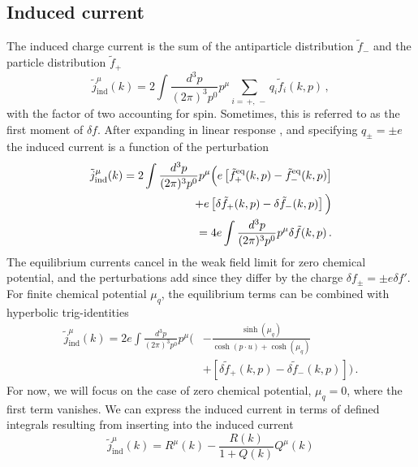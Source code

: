 \subsection{Induced current}

The induced charge current is the sum of the antiparticle distribution $\widetilde{f}_-$ and the particle distribution $\widetilde{f}_+$
\begin{equation}\label{eq:perturbation1}
\tilde{j}_{\mathrm{ind}}^\mu(k) = 2\int \frac{d^3 p}{(2 \pi)^3 p^0}p^\mu 
\sum_{i = \, +, \, -} q_i \tilde{f}_{i}(k,p)\,,
\end{equation}
with the factor of two accounting for spin. Sometimes, this is referred to as the first moment of $\delta f$.
After expanding in linear response , and specifying $q_\pm = \pm e$ the induced current is a function of the perturbation
\begin{align}\label{eq:perturbation2}
\tilde{j}_{\mathrm{ind}}^\mu(k) = 2\int \frac{d^3 p}{(2 \pi)^3 p^0}p^\mu \Big( e \left[\tilde{f}^{\mathrm{eq}}_+(k,p)-\tilde{f}^{\mathrm{eq}}_-(k,p)\right]\notag\\
+ e\left[\delta\tilde{f}_+(k,p)-\delta\tilde{f}_-(k,p)\right]
\Big)
\notag\\
=4 e\int \frac{d^3 p}{(2 \pi)^3 p^0}p^\mu \delta\tilde{f}(k,p)
\,.
\end{align}
The equilibrium currents cancel in the weak field limit for zero chemical potential, and the perturbations add since they differ by the charge $\delta f_\pm=\pm e \delta f' $. For finite chemical potential $\mu_q$, the equilibrium terms can be combined with hyperbolic trig-identities
\begin{equation}
\begin{split}
\tilde{j}_{\mathrm{ind}}^\mu(k) 
=2 e\int \frac{d^3 p}{(2 \pi)^3 p^0}p^\mu \Big(&-\frac{\sinh{(\mu_q)}}{\cosh{(p \cdot u)}+\cosh{(\mu_q)}} \\&+  \left[\delta\tilde{f}_+(k,p)-\delta\tilde{f}_-(k,p)\right]
 \Big)
\,.
\end{split}
\end{equation}
For now, we will focus on the case of zero chemical potential, $\mu_q=0$, where the first term vanishes.
We can express the induced current in terms of defined integrals \cite{Formanek:2021blc} resulting from inserting  into the induced current
\begin{equation}\label{eq:jmu}
\widetilde{j}_{\mathrm{ind}}^\mu(k) = R^\mu(k) - \frac{R(k)}{1+Q(k)} Q^\mu(k)
\end{equation}
